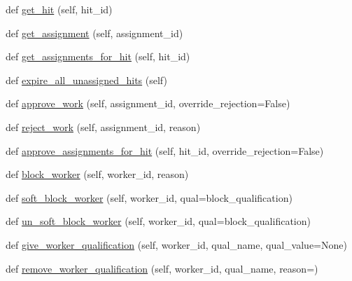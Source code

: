 \begin{DoxyCompactItemize}
\item 
def \hyperlink{classmock__turk__manager_1_1MockTurkManager_aff78eef002bb331207efb61f57d98301}{get\+\_\+hit} (self, hit\+\_\+id)
\item 
def \hyperlink{classmock__turk__manager_1_1MockTurkManager_a9a1bcaedfdee07356cbd66fc706f069b}{get\+\_\+assignment} (self, assignment\+\_\+id)
\item 
def \hyperlink{classmock__turk__manager_1_1MockTurkManager_a11222027946a80475ca787398616c551}{get\+\_\+assignments\+\_\+for\+\_\+hit} (self, hit\+\_\+id)
\item 
def \hyperlink{classmock__turk__manager_1_1MockTurkManager_a22a47326192ac03f4c822df56e5fb581}{expire\+\_\+all\+\_\+unassigned\+\_\+hits} (self)
\item 
def \hyperlink{classmock__turk__manager_1_1MockTurkManager_a887de780aa18882ef07c1bdfe8af822c}{approve\+\_\+work} (self, assignment\+\_\+id, override\+\_\+rejection=False)
\item 
def \hyperlink{classmock__turk__manager_1_1MockTurkManager_a9042a50ac1a0e858872e3e1f3ea85af5}{reject\+\_\+work} (self, assignment\+\_\+id, reason)
\item 
def \hyperlink{classmock__turk__manager_1_1MockTurkManager_ac0b9a9e6fc6e216dd7217ef34ccebf64}{approve\+\_\+assignments\+\_\+for\+\_\+hit} (self, hit\+\_\+id, override\+\_\+rejection=False)
\item 
def \hyperlink{classmock__turk__manager_1_1MockTurkManager_a81f46373be1a6dce31b54efb6f84dd08}{block\+\_\+worker} (self, worker\+\_\+id, reason)
\item 
def \hyperlink{classmock__turk__manager_1_1MockTurkManager_a3a03c892540501e2fa506c6c7118c07f}{soft\+\_\+block\+\_\+worker} (self, worker\+\_\+id, qual=\textquotesingle{}block\+\_\+qualification\textquotesingle{})
\item 
def \hyperlink{classmock__turk__manager_1_1MockTurkManager_ae7d3ae75de08b2e3d74413418a6d9602}{un\+\_\+soft\+\_\+block\+\_\+worker} (self, worker\+\_\+id, qual=\textquotesingle{}block\+\_\+qualification\textquotesingle{})
\item 
def \hyperlink{classmock__turk__manager_1_1MockTurkManager_a55364f9864ca6f6b395cf1e261e016a5}{give\+\_\+worker\+\_\+qualification} (self, worker\+\_\+id, qual\+\_\+name, qual\+\_\+value=None)
\item 
def \hyperlink{classmock__turk__manager_1_1MockTurkManager_a3fe1f5b71470e63e9c4339bed5f8486f}{remove\+\_\+worker\+\_\+qualification} (self, worker\+\_\+id, qual\+\_\+name, reason=\textquotesingle{}\textquotesingle{})

\end{DoxyCompactItemize}
